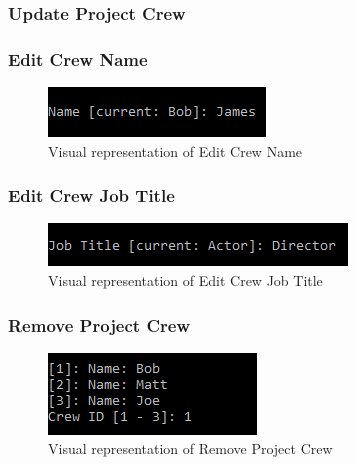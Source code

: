 \documentclass[
  english,
  a4paper,
,tablecaptionabove
]{scrartcl}
\begin{document}
\newpage

\hypertarget{update-project-crew}{%
\subsubsection{Update Project Crew}\label{update-project-crew}}

\hypertarget{edit-crew-name-1}{%
\subsubsection{Edit Crew Name}\label{edit-crew-name-1}}

\begin{figure}
\centering
\includegraphics{images/ui-screenshots/update-crew-name.png}
\caption{Visual representation of Edit Crew Name}
\end{figure}

\newpage

\hypertarget{edit-crew-job-title-1}{%
\subsubsection{Edit Crew Job Title}\label{edit-crew-job-title-1}}

\begin{figure}
\centering
\includegraphics{images/ui-screenshots/update-crew-job-title.png}
\caption{Visual representation of Edit Crew Job Title}
\end{figure}

\newpage

\hypertarget{remove-project-crew}{%
\subsubsection{Remove Project Crew}\label{remove-project-crew}}

\begin{figure}
\centering
\includegraphics{images/ui-screenshots/remove-crew.png}
\caption{Visual representation of Remove Project Crew}
\end{figure}
\end{document}
